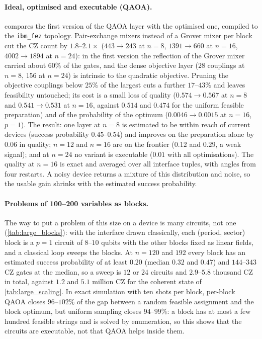 \paragraph{Ideal, optimised and executable (QAOA).}  compares the first version of the QAOA layer with the optimised one, compiled to the \texttt{ibm\_fez} topology. Pair-exchange mixers instead of a Grover mixer per block cut the CZ count by $1.8$--$2.1\times$ ($443\to243$ at $n=8$, $1391\to660$ at $n=16$, $4002\to1894$ at $n=24$): in the first version the reflection of the Grover mixer carried about $60\%$ of the gates, and the dense objective layer ($28$ couplings at $n=8$, $156$ at $n=24$) is intrinsic to the quadratic objective. Pruning the objective couplings below $25\%$ of the largest cuts a further $17$--$43\%$ and leaves feasibility untouched; its cost is a small loss of quality ($0.574\to0.567$ at $n=8$ and $0.541\to0.531$ at $n=16$, against $0.514$ and $0.474$ for the uniform feasible preparation) and of the probability of the optimum ($0.0046\to0.0015$ at $n=16$, $p=1$). The result: one layer at $n=8$ is estimated to be within reach of current devices (success probability $0.45$--$0.54$) and improves on the preparation alone by $0.06$ in quality; $n=12$ and $n=16$ are on the frontier ($0.12$ and $0.29$, a weak signal); and at $n=24$ no variant is executable ($0.01$ with all optimisations). The quality at $n=16$ is exact and averaged over all interface tuples, with angles from four restarts. A noisy device returns a mixture of this distribution and noise, so the usable gain shrinks with the estimated success probability.



\paragraph{Problems of 100--200 variables as blocks.} The way to put a problem of this size on a device is many circuits, not one (\cref{tab:large_blocks}): with the interface drawn classically, each (period, sector) block is a $p=1$ circuit of $8$--$10$ qubits with the other blocks fixed as linear fields, and a classical loop sweeps the blocks. At $n=120$ and $192$ every block has an estimated success probability of at least $0.20$ (median $0.32$ and $0.47$) and $144$--$343$ CZ gates at the median, so a sweep is $12$ or $24$ circuits and $2.9$--$5.8$ thousand CZ in total, against $1.2$ and $5.1$ million CZ for the coherent state of \cref{tab:large_scaling}. In exact simulation with ten shots per block, per-block QAOA closes $96$--$102\%$ of the gap between a random feasible assignment and the block optimum, but uniform sampling closes $94$--$99\%$: a block has at most a few hundred feasible strings and is solved by enumeration, so this shows that the circuits are executable, not that QAOA helps inside them.


